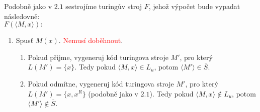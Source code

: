 \documentclass{article}
\begin{document}
Podobně jako v $2.1$ sestrojíme turingův stroj $F$, jehož výpočet bude vypadat
následovně: \\
$ F(\langle M, x \rangle):$
\begin{enumerate}
  \item Spusť $M(x)$. \textcolor{red}{Nemusí doběhnout}.
  \begin{enumerate}
    \item Pokud přijme, vygeneruj kód turingova stroje $M'$, pro který
    $L(M') = \{x\}$. Tedy pokud $\langle M, x \rangle \in L_u$, potom
    $\langle M' \rangle \in \overline{S}$.

    \item Pokud odmítne, vygeneruj kód turingova stroje $M'$, pro který
    $L(M') = \{x, x^R\}$ (podobně jako v $2.1$). Tedy pokud 
    $\langle M, x \rangle \notin L_u$, potom 
    $\langle M' \rangle \notin \overline{S}$.
  \end{enumerate}
\end{enumerate}
\end{document}
